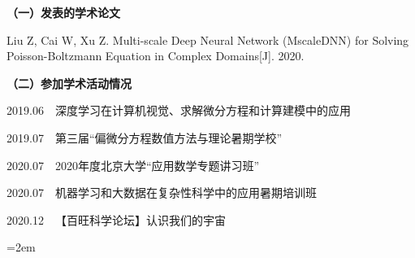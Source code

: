 
\setlength{\parindent}{0em}
\textbf{（一）发表的学术论文}
\begin{publist}
\item Liu Z, Cai W, Xu Z. Multi-scale Deep Neural Network (MscaleDNN) for Solving Poisson-Boltzmann Equation in Complex Domains[J].  2020.
\end{publist}

\textbf{（二）参加学术活动情况}
\begin{publist}
\item 2019.06~\quad~深度学习在计算机视觉、求解微分方程和计算建模中的应用
\item 2019.07~\quad~第三届“偏微分方程数值方法与理论暑期学校”
\item 2020.07~\quad~2020年度北京大学“应用数学专题讲习班”
\item 2020.07~\quad~机器学习和大数据在复杂性科学中的应用暑期培训班
\item 2020.12~\quad~【百旺科学论坛】认识我们的宇宙
\end{publist}
\vfill
{}\hangindent=2em\noindent

\setlength{\parindent}{2em}
